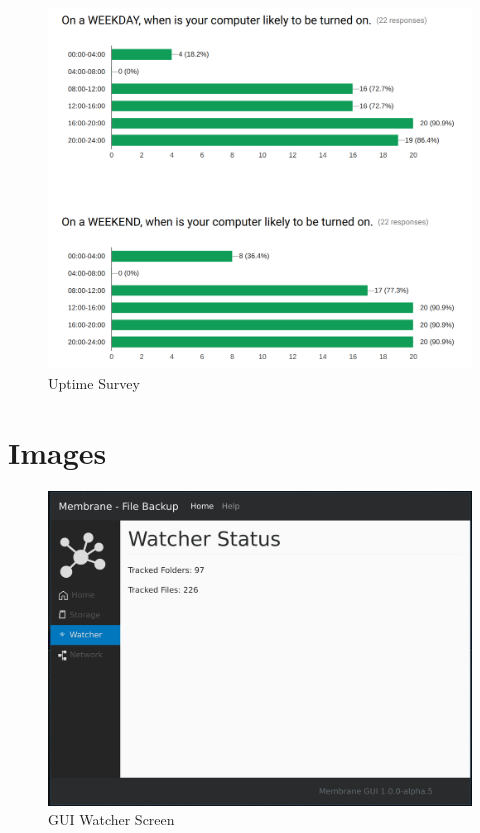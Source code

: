 \documentclass[11pt, a4paper, twoside]{report}
\begin{document}
\setlist{}

\begin{figure}[ht!]
 \centering
 \includegraphics[width=\textwidth]{uptime-survey}
 \caption{Uptime Survey}
 \label{fig:uptime-survey}
\end{figure}

\pagebreak

\section{Images}

\begin{figure}[!htb]
 \centering
 \includegraphics[width=\textwidth]{gui-watcher}
 \caption{GUI Watcher Screen}
 \label{fig:gui-watcher}
\end{figure}
\end{document}
